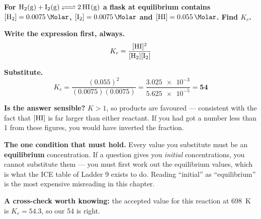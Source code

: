 \documentclass{apchem-worksheet}
\begin{document}
\begin{workedexample}
\textbf{For $\ce{H2(g) + I2(g) <=> 2HI(g)}$ a flask at equilibrium
contains $[\ce{H2}] = \SI{0.0075}{\Molar}$, $[\ce{I2}] =
\SI{0.0075}{\Molar}$ and $[\ce{HI}] = \SI{0.055}{\Molar}$. Find
$K_{c}$.}

\textbf{Write the expression first, always.}
\[ K_{c} = \frac{[\ce{HI}]^{2}}{[\ce{H2}][\ce{I2}]} \]

\textbf{Substitute.}
\[ K_{c} = \frac{(0.055)^{2}}{(0.0075)(0.0075)}
         = \frac{\num{3.025e-3}}{\num{5.625e-5}}
         = \mathbf{54} \]

\textbf{Is the answer sensible?} $K > 1$, so products are favoured ---
consistent with the fact that $[\ce{HI}]$ is far larger than either
reactant. If you had got a number less than 1 from these figures, you
would have inverted the fraction.

\textbf{The one condition that must hold.} Every value you substitute
must be an \textbf{equilibrium} concentration. If a question gives you
\emph{initial} concentrations, you cannot substitute them --- you must
first work out the equilibrium values, which is what the ICE table of
Ladder 9 exists to do. Reading ``initial'' as ``equilibrium'' is the
most expensive misreading in this chapter.

\textbf{A cross-check worth knowing:} the accepted value for this
reaction at \SI{698}{\kelvin} is $K_{c} = 54.3$, so our 54 is right.
\end{workedexample}
\end{document}
